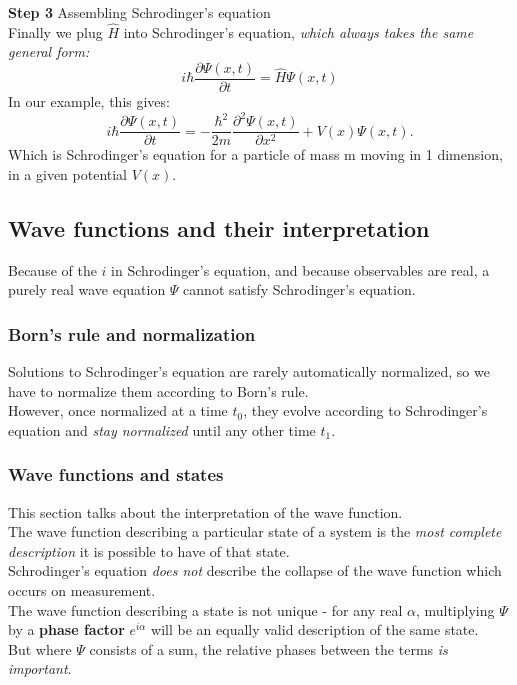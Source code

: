 \documentclass{article}
\begin{document}
\textbf{Step 3} Assembling Schrodinger's equation\\
Finally we plug $\hat{H}$ into Schrodinger's equation, \emph{which always takes the same general form:}
$$ i \hbar\frac{\partial\Psi(x,t)}{\partial t} = \hat{H}\Psi(x,t) $$
In our example, this gives:
$$ i \hbar\frac{\partial\Psi(x,t)}{\partial t} = - \frac{\hbar^2}{2m} \frac{\partial^2 \Psi(x,t)}{\partial x^2} + V(x)\Psi(x,t). $$
Which is Schrodinger's equation for a particle of mass m moving in 1 dimension, in a given potential $V(x)$.

\subsection{Wave functions and their interpretation}
Because of the $i$ in Schrodinger's equation, and because observables are real, a purely real wave equation $\Psi$ cannot satisfy Schrodinger's equation.

\subsubsection{Born's rule and normalization}
Solutions to Schrodinger's equation are rarely automatically normalized, so we have to normalize them according to Born's rule.\\
However, once normalized at a time $t_0$, they evolve according to Schrodinger's equation and \emph{stay normalized} until any other time $t_1$.

\subsubsection{Wave functions and states}
This section talks about the interpretation of the wave function.\\
The wave function describing a particular state of a system is the \emph{most complete description} it is possible to have of that state.\\
Schrodinger's equation \emph{does not} describe the collapse of the wave function which occurs on measurement.\\
The wave function describing a state is not unique - for any real $\alpha$, multiplying $\Psi$ by a \textbf{phase factor} $e^{i\alpha}$ will be an equally valid description of the same state.\\
But where $\Psi$ consists of a sum, the relative phases between 
the terms \emph{is important}.\\
\end{document}

